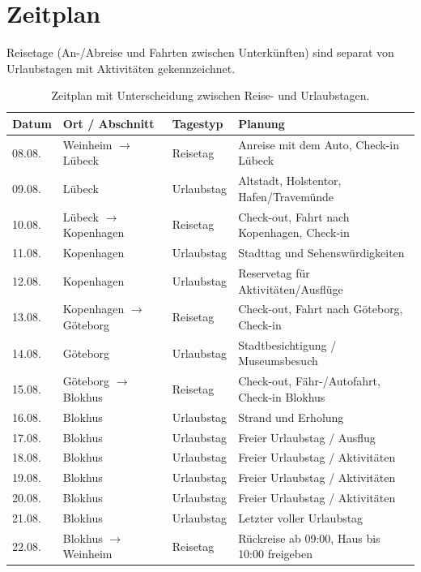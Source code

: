 \documentclass[a4paper,12pt]{article}
\begin{document}
\section{Zeitplan}
Reisetage (An-/Abreise und Fahrten zwischen Unterkünften) sind separat von Urlaubstagen mit Aktivitäten gekennzeichnet.

\begin{table}[H] %
\centering
\begin{tabular}{|l|l|l|l|}
\hline
\textbf{Datum} & \textbf{Ort / Abschnitt} & \textbf{Tagestyp} & \textbf{Planung} \\
\hline
08.08. & Weinheim $\rightarrow$ Lübeck & Reisetag & Anreise mit dem Auto, Check-in Lübeck \\
09.08. & Lübeck & Urlaubstag & Altstadt, Holstentor, Hafen/Travemünde \\
10.08. & Lübeck $\rightarrow$ Kopenhagen & Reisetag & Check-out, Fahrt nach Kopenhagen, Check-in \\
11.08. & Kopenhagen & Urlaubstag & Stadttag und Sehenswürdigkeiten \\
12.08. & Kopenhagen & Urlaubstag & Reservetag für Aktivitäten/Ausflüge \\
13.08. & Kopenhagen $\rightarrow$ Göteborg & Reisetag & Check-out, Fahrt nach Göteborg, Check-in \\
14.08. & Göteborg & Urlaubstag & Stadtbesichtigung / Museumsbesuch \\
15.08. & Göteborg $\rightarrow$ Blokhus & Reisetag & Check-out, Fähr-/Autofahrt, Check-in Blokhus \\
16.08. & Blokhus & Urlaubstag & Strand und Erholung \\
17.08. & Blokhus & Urlaubstag & Freier Urlaubstag / Ausflug \\
18.08. & Blokhus & Urlaubstag & Freier Urlaubstag / Aktivitäten \\
19.08. & Blokhus & Urlaubstag & Freier Urlaubstag / Aktivitäten \\
20.08. & Blokhus & Urlaubstag & Freier Urlaubstag / Aktivitäten \\
21.08. & Blokhus & Urlaubstag & Letzter voller Urlaubstag \\
22.08. & Blokhus $\rightarrow$ Weinheim & Reisetag & Rückreise ab 09:00, Haus bis 10:00 freigeben \\
\hline
\end{tabular}
\caption{Zeitplan mit Unterscheidung zwischen Reise- und Urlaubstagen.}
\label{tab:Zeitplan}
\end{table}
\end{document}

